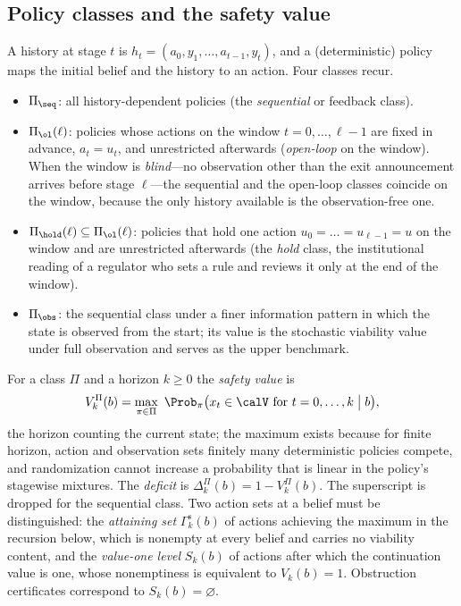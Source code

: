 \subsection{Policy classes and the safety value}

A history at stage $t$ is $h_t=(a_0,y_1,\dots,a_{t-1},y_t)$, and a (deterministic) policy maps the initial belief and the history to an action. Four classes recur.
\begin{itemize}[leftmargin=1.6em,itemsep=1pt]
\item $\Pi_{\seq}$: all history-dependent policies (the \emph{sequential} or feedback class).
\item $\Pi_{\ol}(\ell)$: policies whose actions on the window $t=0,\dots,\ell-1$ are fixed in advance, $a_t=u_t$, and unrestricted afterwards (\emph{open-loop} on the window). When the window is \emph{blind}---no observation other than the exit announcement arrives before stage $\ell$---the sequential and the open-loop classes coincide on the window, because the only history available is the observation-free one.
\item $\Pi_{\hold}(\ell)\subseteq\Pi_{\ol}(\ell)$: policies that hold one action $u_0=\dots=u_{\ell-1}=u$ on the window and are unrestricted afterwards (the \emph{hold} class, the institutional reading of a regulator who sets a rule and reviews it only at the end of the window).
\item $\Pi_{\obs}$: the sequential class under a finer information pattern in which the state is observed from the start; its value is the stochastic viability value under full observation \cite{DoyenDeLara2010} and serves as the upper benchmark.
\end{itemize}

\begin{definition}\label{def:value}
For a class $\Pi$ and a horizon $k\ge0$ the \emph{safety value} is
\[
V^{\Pi}_{k}(b)=\max_{\pi\in\Pi}\ \Prob_{\pi}\bigl(x_t\in\calV\text{ for }t=0,\dots,k\;\big|\;b\bigr),
\]
the horizon counting the current state; the maximum exists because for finite horizon, action and observation sets finitely many deterministic policies compete, and randomization cannot increase a probability that is linear in the policy's stagewise mixtures. The \emph{deficit} is $\Delta^{\Pi}_k(b)=1-V^{\Pi}_k(b)$. The superscript is dropped for the sequential class. Two action sets at a belief must be distinguished: the \emph{attaining set} $\Gamma^{\mathrm s}_k(b)$ of actions achieving the maximum in the recursion below, which is nonempty at every belief and carries no viability content, and the \emph{value-one level} $S_k(b)$ of actions after which the continuation value is one, whose nonemptiness is equivalent to $V_k(b)=1$. Obstruction certificates correspond to $S_k(b)=\varnothing$.
\end{definition}

